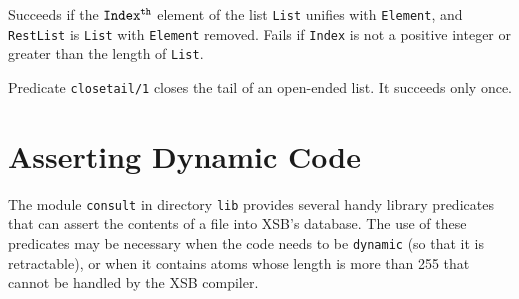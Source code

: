 \begin{description}
    Succeeds if the ${\tt Index^{th}}$ element of the list {\tt List}
    unifies with {\tt Element}, and {\tt RestList} is {\tt List} with
    {\tt Element} removed.  Fails if {\tt Index} is not a positive
    integer or greater than the length of {\tt List}.

    Predicate {\tt closetail/1} closes the tail of an open-ended list.
    It succeeds only once.

\end{description}



\section{Asserting Dynamic Code} \label{LoadDyn}

The module {\tt consult} in directory {\tt lib} provides several handy
library predicates that can assert the contents of a file into
XSB's database.  The use of these predicates may be necessary
when the code needs to be {\tt dynamic} (so that it is retractable),
or when it contains atoms whose length is more than 255 that cannot be
handled by the XSB compiler.

